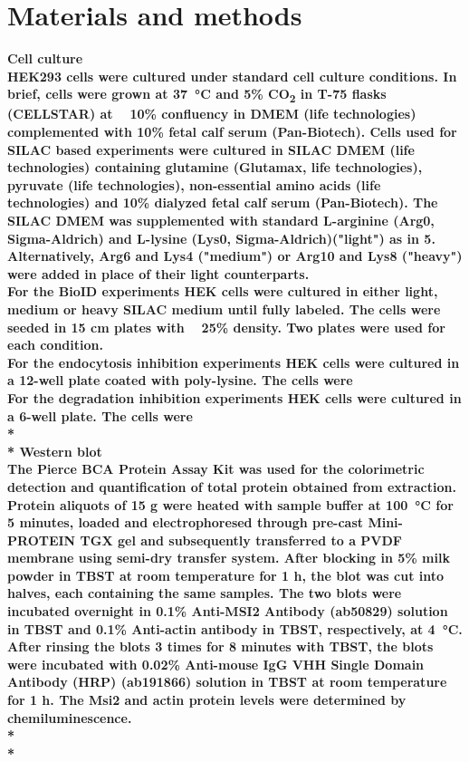 
\chapter{Materials and methods} %
\label{Chapter2} %


\bfseries{Cell culture}\\
\normalfont HEK293 cells were cultured under standard cell culture conditions. In brief, cells were grown at \SI{37}{\celsius} and 5\% CO\textsubscript{2} in T-75 flasks (CELLSTAR) at ~ 10\% confluency in DMEM (life technologies) complemented with 10\% fetal calf serum (Pan-Biotech). Cells used for SILAC based experiments were cultured in SILAC DMEM (life technologies) containing glutamine (Glutamax, life technologies), pyruvate (life technologies), non-essential amino acids (life technologies) and 10\% dialyzed fetal calf serum (Pan-Biotech). The SILAC DMEM was supplemented with standard L-arginine (Arg0, Sigma-Aldrich) and L-lysine (Lys0, Sigma-Aldrich)("light") as in 5. Alternatively, Arg6 and Lys4 ("medium") or Arg10 and Lys8 ("heavy") were added in place of their light counterparts.\\
For the BioID experiments HEK cells were cultured in either light, medium or heavy SILAC medium until fully labeled. The cells were seeded in 15 cm plates with ~ 25\% density. Two plates were used for each condition. \\
For the endocytosis inhibition experiments HEK cells were cultured in a 12-well plate coated with poly-lysine. The cells were \\
For the degradation inhibition experiments HEK cells were cultured in a 6-well plate. The cells were
\\*
\\*
\bfseries{Western blot}\\
\normalfont The Pierce BCA Protein Assay Kit was used for the colorimetric detection and quantification of total protein obtained from extraction. Protein aliquots of 15 \si{\micro}g were heated with sample buffer at \SI{100}{\celsius} for 5 minutes, loaded and electrophoresed through pre-cast Mini-PROTEIN TGX gel and subsequently transferred to a PVDF membrane using semi-dry transfer system. After blocking in 5\% milk powder in TBST at room temperature for 1 h, the blot was cut into halves, each containing the same samples. The two blots were incubated overnight in 0.1\% Anti-MSI2 Antibody (ab50829) solution in TBST and 0.1\% Anti-actin antibody in TBST, respectively, at \SI{4}{\celsius}. After rinsing the blots 3 times for 8 minutes with TBST, the blots were incubated with 0.02\% Anti-mouse IgG VHH Single Domain Antibody (HRP) (ab191866) solution in TBST at room temperature for 1 h. The Msi2 and actin protein levels were determined by chemiluminescence.
\\*
\\*

